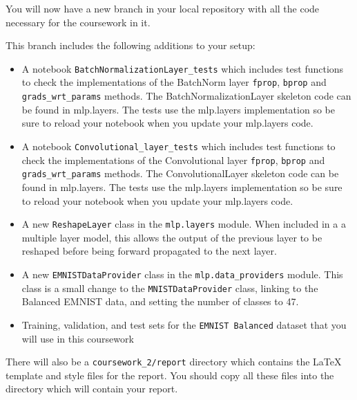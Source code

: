 \documentclass[11pt,]{article}
\begin{document}
You will now have a new branch in your local repository with all the
code necessary for the coursework in it.   

This branch includes the following additions to your setup:

\begin{itemize}
	\itemsep1pt\parskip0pt
	\item
	A notebook \verb+BatchNormalizationLayer_tests+ which includes 
	test functions to check the implementations of the BatchNorm layer
	\texttt{fprop}, \texttt{bprop} and \texttt{grads\_wrt\_params}
	methods. The BatchNormalizationLayer skeleton code can be found in mlp.layers. 
	The tests use the mlp.layers implementation so be sure to reload your notebook
	when you update your mlp.layers code.
	\item
	A notebook \verb+Convolutional_layer_tests+ which includes
	test functions to check the implementations of the Convolutional layer
	\texttt{fprop}, \texttt{bprop} and \texttt{grads\_wrt\_params}
	methods. The ConvolutionalLayer skeleton code can be found in mlp.layers. 
	The tests use the mlp.layers implementation so be sure to reload your notebook
	when you update your mlp.layers code.
	\item
	A new \texttt{ReshapeLayer} class in the \verb+mlp.layers+ module.
	When included in a a multiple layer model, this allows the output of
	the previous layer to be reshaped before being forward propagated to
	the next layer.
	\item
	A new \texttt{EMNISTDataProvider} class in the \verb+mlp.data_providers+ module.
	This class is a small change to the \texttt{MNISTDataProvider} class, linking to the Balanced EMNIST data, and setting the number of classes to 47.
	\item
	Training, validation, and test sets for the \texttt{EMNIST Balanced} dataset that
	you will use in this coursework
\end{itemize}



There will also be a \verb+coursework_2/report+ directory which contains the LaTeX template and style files for the report.  You should copy all these files into the directory which will contain your report.
\end{document}
